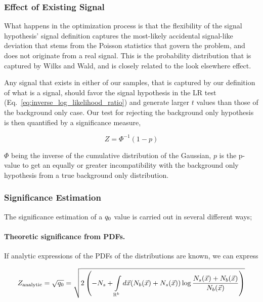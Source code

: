 \documentclass[paper/ddppaper2.tex]{subfiles}
\begin{document}
\subsubsection{Effect of Existing Signal}

What happens in the optimization process is that the flexibility of the signal hypothesis' signal definition captures the most-likely accidental signal-like deviation that stems from the Poisson statistics that govern the problem, and does not originate from a real signal. This is the probability distribution that is captured by Wilks and Wald, and is closely related to the look elsewhere effect.

Any signal that exists in either of our samples, that is captured by our definition of what is a signal, should favor the signal hypothesis in the LR test (Eq.~\ref{eq:inverse_log_likelihood_ratio}) and generate larger $t$ values than those of the background only case. Our test for rejecting the background only hypothesis is then quantified by a significance measure,

\begin{equation}
    Z = \Phi^{-1}(1-p)
\end{equation}

\noindent $\Phi$ being the inverse of the cumulative distribution of the Gaussian, $p$ is the p-value to get an equally or greater incompatibility with the background only hypothesis from a true background only distribution.

\subsubsection{Significance Estimation}

The significance estimation of a ${q_{0}}$ value is carried out in several different ways;


    \paragraph{Theoretic significance from PDFs.}

    If analytic expressions of the PDFs of the distributions are known, we can express

    \begin{wideequations}
\begin{equation}
    \label{eq:analytic_significance_from_pdfs}
        Z_\text{analytic} = \sqrt{\invllratio} = \sqrt  {
            2 \left( -N_s + \int\limits_{\mathbb{R}^{k}} d\anyevent (N_b(\anyevent) + N_s(\anyevent)) \log \dfrac{N_s(\anyevent) + N_b(\anyevent)}{N_b(\anyevent)} \right)
        }
    \end{equation}
\end{wideequations}
\end{document}
